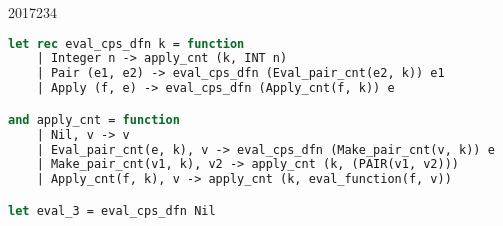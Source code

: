 \documentclass[10pt,\jkfside,a4paper]{article}
\begin{document}
\begin{examquestion}{2017}{23}{4}
\begin{enumerate}
\begin{lstlisting}[language=Caml]
let rec eval_cps_dfn k = function
	| Integer n -> apply_cnt (k, INT n)
	| Pair (e1, e2) -> eval_cps_dfn (Eval_pair_cnt(e2, k)) e1
	| Apply (f, e) -> eval_cps_dfn (Apply_cnt(f, k)) e

and apply_cnt = function
	| Nil, v -> v
	| Eval_pair_cnt(e, k), v -> eval_cps_dfn (Make_pair_cnt(v, k)) e
	| Make_pair_cnt(v1, k), v2 -> apply_cnt (k, (PAIR(v1, v2)))
	| Apply_cnt(f, k), v -> apply_cnt (k, eval_function(f, v))

let eval_3 = eval_cps_dfn Nil
\end{lstlisting}

\end{enumerate}

\end{examquestion}
\end{document}
